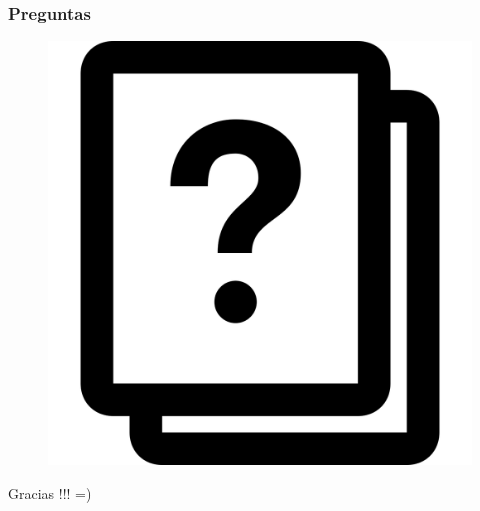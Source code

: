 \documentclass{beamer}
\begin{document}
\begin{frame}
\frametitle{Preguntas}
\begin{figure}
\includegraphics[width=0.4\linewidth]{preguntas.png}
\end{figure}
\end{frame}

\begin{frame}
\Huge{\centerline{Gracias !!! =)}}
\end{frame}

\end{document}

